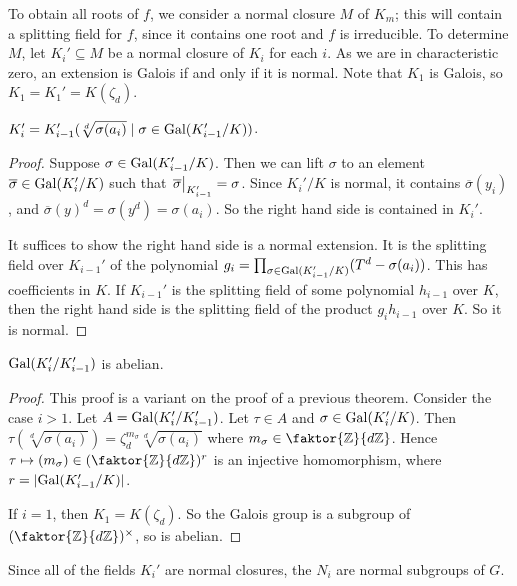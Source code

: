 To obtain all roots of \( f \), we consider a normal closure \( M \) of \( K_m \); this will contain a splitting field for \( f \), since it contains one root and \( f \) is irreducible.
To determine \( M \), let \( K_i' \subseteq M \) be a normal closure of \( K_i \) for each \( i \).
As we are in characteristic zero, an extension is Galois if and only if it is normal.
Note that \( K_1 \) is Galois, so \( K_1 = K_1' = K(\zeta_d) \).
\begin{proposition}
	\( K_i' = K_{i-1}'({\sqrt[d]{\sigma(a_i)} \mid \sigma \in \operatorname{Gal}(K_{i-1}'/K)}) \).
\end{proposition}
\begin{proof}
	Suppose \( \sigma \in \operatorname{Gal}(K_{i-1}'/K) \).
	Then we can lift \( \sigma \) to an element \( \overline \sigma \in \operatorname{Gal}(K_i'/K) \) such that \( \eval{\overline\sigma}_{K_{i-1}'} = \sigma \).
	Since \( K_i' / K \) is normal, it contains \( \overline \sigma(y_i) \), and \( \overline \sigma(y)^d = \sigma(y^d) = \sigma(a_i) \).
	So the right hand side is contained in \( K_i' \).

	It suffices to show the right hand side is a normal extension.
	It is the splitting field over \( K_{i-1}' \) of the polynomial \( g_i = \prod_{\sigma \in \operatorname{Gal}(K_{i-1}'/K)} (T^d - \sigma(a_i)) \).
	This has coefficients in \( K \).
	If \( K_{i-1}' \) is the splitting field of some polynomial \( h_{i-1} \) over \( K \), then the right hand side is the splitting field of the product \( g_i h_{i-1} \) over \( K \).
	So it is normal.
\end{proof}
\begin{proposition}
	\( \operatorname{Gal}(K_i'/K_{i-1}') \) is abelian.
\end{proposition}
\begin{proof}
	This proof is a variant on the proof of a previous theorem.
	Consider the case \( i > 1 \).
	Let \( A = \operatorname{Gal}(K_i'/K_{i-1}') \).
	Let \( \tau \in A \) and \( \sigma \in \operatorname{Gal}(K_i'/K) \).
	Then \( \tau(\sqrt[d]{\sigma(a_i)}) = \zeta_d^{m_\sigma} \sqrt[d]{\sigma(a_i)} \) where \( m_\sigma \in \faktor{\mathbb Z}{d\mathbb Z} \).
	Hence \( \tau \mapsto (m_\sigma) \in (\faktor{\mathbb Z}{d\mathbb Z})^r \) is an injective homomorphism, where \( r = \lvert\operatorname{Gal}(K_{i-1}'/K)\rvert \).

	If \( i = 1 \), then \( K_1 = K(\zeta_d) \).
	So the Galois group is a subgroup of \( (\faktor{\mathbb Z}{d\mathbb Z})^\times \), so is abelian.
\end{proof}
Since all of the fields \( K_i' \) are normal closures, the \( N_i \) are normal subgroups of \( G \).
